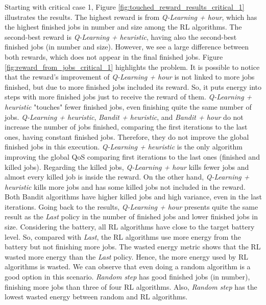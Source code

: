 Starting with critical case 1, Figure \ref{fig:touched_reward_results_critical_1} illustrates the results. The highest reward is from \emph{Q-Learning + hour}, which has the highest finished jobs in number and size among the RL algorithms. The second-best reward is \emph{Q-Learning + heuristic}, having also the second-best finished jobs (in number and size). However, we see a large difference between both rewards, which does not appear in the final finished jobs. Figure \ref{fig:reward_from_jobs_critical_1} highlights the problem. It is possible to notice that the reward's improvement of \emph{Q-Learning + hour} is not linked to more jobs finished, but due to more finished jobs included its reward. So, it puts energy into steps with more finished jobs just to receive the reward of them. \emph{Q-Learning + heuristic} "touches" fewer finished jobs, even finishing quite the same number of jobs. \emph{Q-Learning + heuristic}, \emph{Bandit + heuristic}, and \emph{Bandit + hour} do not increase the number of jobs finished, comparing the first iterations to the last ones, having constant finished jobs. Therefore, they do not improve the global finished jobs in this execution. \emph{Q-Learning + heuristic} is the only algorithm improving the global QoS comparing first iterations to the last ones (finished and killed jobs). Regarding the killed jobs, \emph{Q-Learning + hour} kills fewer jobs and almost every killed job is inside the reward. On the other hand, \emph{Q-Learning + heuristic} kills more jobs and has some killed jobs not included in the reward. Both Bandit algorithms have higher killed jobs and high variance, even in the last iterations. Going back to the results, \emph{Q-Learning + hour} presents quite the same result as the \emph{Last} policy in the number of finished jobs and lower finished jobs in size. Considering the battery, all RL algorithms have close to the target battery level. So, compared with \emph{Last}, the RL algorithms use more energy from the battery but not finishing more jobs. The wasted energy metric shows that the RL wasted more energy than the \emph{Last} policy. Hence, the more energy used by RL algorithms is wasted. We can observe that even doing a random algorithm is a good option in this scenario. \emph{Random step} has good finished jobs (in number), finishing more jobs than three of four RL algorithms. Also, \emph{Random step} has the lowest wasted energy between random and RL algorithms.

